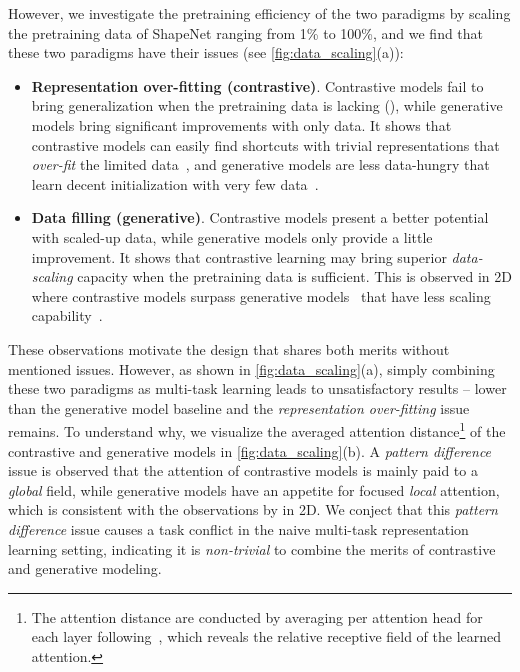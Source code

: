 \documentclass{article}
\theoremstyle{plain}
\theoremstyle{definition}
\theoremstyle{remark}
\begin{document}
However, we investigate the pretraining efficiency of the two paradigms by scaling the pretraining data of ShapeNet ranging from 1\% to 100\%, and we find that these two paradigms have their issues (see \cref{fig:data_scaling}(a)):
\vspace{-10pt}
\begin{itemize}
    \item \textbf{Representation over-fitting (contrastive)}. Contrastive models fail to bring generalization when the pretraining data is lacking (), while generative models bring significant improvements with only  data. It shows that contrastive models can easily find shortcuts with trivial representations that \textit{over-fit} the limited data~\citep{MoCo}, and generative models are less data-hungry that learn decent initialization with very few data~\citep{InvariantMIM22}.
    \vspace{-12pt}
    \item \textbf{Data filling (generative)}. Contrastive models present a better potential with scaled-up data, while generative models only provide a little improvement. 
    It shows that contrastive learning may bring superior \textit{data-scaling} capacity when the pretraining data is sufficient. 
    This is observed in 2D where contrastive models surpass generative models~\citep{TuneCLIP22} that have less scaling capability~\citep{ScaleMIM22}.
\end{itemize}
\vspace{-10pt}

These observations motivate the design that shares both merits without mentioned issues.
However, as shown in \cref{fig:data_scaling}(a), simply combining these two paradigms as multi-task learning leads to unsatisfactory results -- lower than the generative model baseline and the \textit{representation over-fitting} issue remains. 
To understand why, we visualize the averaged attention distance\footnote{The attention distance are conducted by averaging per attention head for each layer following~\citet{ViT}, which reveals the relative receptive field of the learned attention.} of the contrastive and generative models in \cref{fig:data_scaling}(b).
A \textit{pattern difference} issue is observed that the attention of contrastive models is mainly paid to a \textit{global} field, while generative models have an appetite for focused \textit{local} attention, which is consistent with the observations by \citet{DarkMIM22} in 2D. 
We conject that this \textit{pattern difference} issue causes a task conflict in the naive multi-task representation learning setting, indicating it is \textit{non-trivial} to combine the merits of contrastive and generative modeling.
\end{document}
